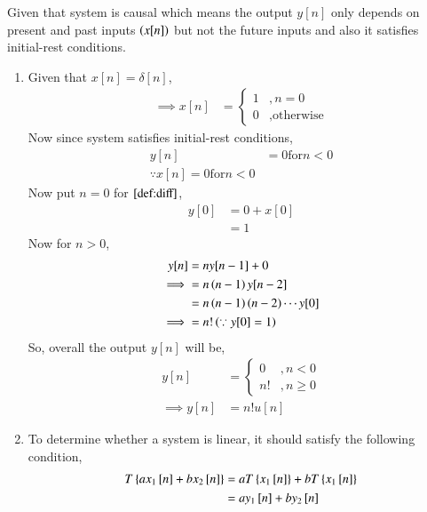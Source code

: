 \documentclass[journal,12pt,twocolumn]{IEEEtran}
\begin{document}
\solution Given that system is causal which means the output $y[n]$ only depends on present and past inputs $\left(x[n]\right)$ but not the future inputs and also it satisfies initial-rest conditions.

\begin{enumerate}[label = (\alph*)]
	\item Given that $x[n] = \delta[n]$,
		\begin{align}
	      \implies x[n] &= \begin{cases}
			     1 &, n = 0 \\
			     0 &, \text{otherwise}
                         \end{cases}
                \end{align}
Now since system satisfies initial-rest conditions, 
              \begin{align}
		      y[n] &= 0 \text{for} n <0 \\
		      \because x[n] = 0 \text{for} n < 0 \nonumber
              \end{align}
	      Now put $n = 0$ for $\eqref{def:diff}$,
	      \begin{align}
		      y[0] &= 0+ x[0] \\
		           &= 1
	      \end{align}
	Now for $n > 0$,
	 \begin{align}
		 y[n] &= ny[n-1] + 0 \\
             \implies &= n\left(n-1\right)y[n-2] \\
		      &= n\left(n-1\right)\left(n-2\right)\cdots y[0] \\
	     \implies &= n! \left(\because y[0] = 1\right) 
          \end{align}
	So, overall the output $y[n]$ will be,
	 \begin{align}
		 y[n] &= \begin{cases}
			        0  &, n <0 \\
				n! &, n \geq 0
		         \end{cases}\\
			 \implies y[n] &= n!u[n] \label{result}
	  \end{align}
    \item To determine whether a system is linear, it should satisfy the following condition,
	     \begin{align}
	       T\cbrak{ax_{1}\sbrak{n} + bx_2\sbrak{n}} &= aT\cbrak{x_{1}\sbrak{n}} + bT\cbrak{x_{1}\sbrak{n}} \\
	                                                &= ay_{1}\sbrak{n} + by_{2}\sbrak{n}

\end{align}
\end{enumerate}
\end{document}
